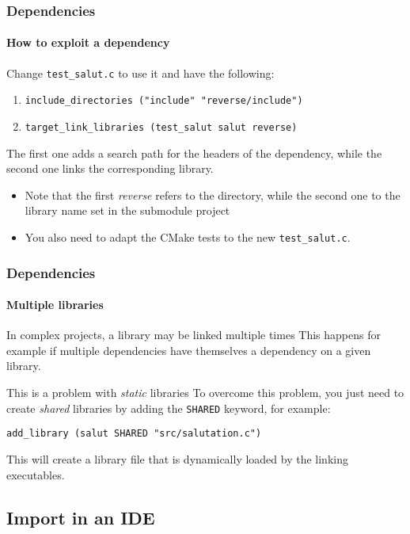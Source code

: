 \begin{frame}
\frametitle{Dependencies}
\framesubtitle{How to exploit a dependency}

\begin{block}{Change \texttt{test\_salut.c} to use it and have the following:}
\begin{enumerate}
\item {\scriptsize \texttt{include\_directories ("include" "reverse/include")}}
\item {\scriptsize \texttt{target\_link\_libraries (test\_salut salut reverse)}}
\end{enumerate}
The first one adds a search path for the headers of the dependency, while the second one links the corresponding library.
\begin{itemize}
\item Note that the first {\em reverse} refers to the directory, while the second one to the library name set in the submodule project
\item You also need to adapt the CMake tests to the new \texttt{test\_salut.c}.
\end{itemize}
\end{block}

\end{frame}

\begin{frame}
\frametitle{Dependencies}
\framesubtitle{Multiple libraries}

\begin{block}{In complex projects, a library may be linked multiple times}
This happens for example if multiple dependencies have themselves a dependency on a given library.
\end{block}
\pause
\begin{block}{This is a problem with {\em static} libraries}
To overcome this problem, you just need to create {\em shared} libraries by adding the \texttt{SHARED} keyword, for example:

\medskip

\texttt{add\_library (salut SHARED "src/salutation.c")}

\medskip

This will create a library file that is dynamically loaded by the linking executables.

\end{block}

\end{frame}

\subsection{Import in an IDE}

